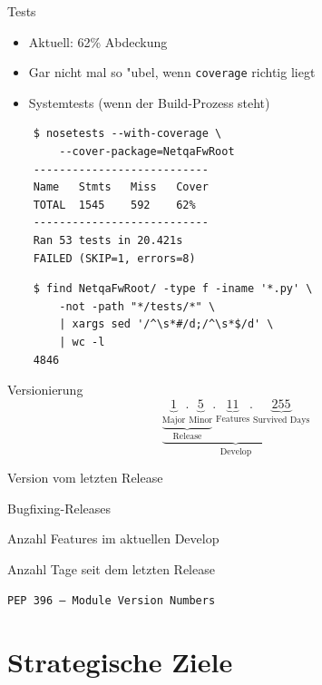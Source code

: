 \documentclass{beamer}
\begin{document}
\begin{frame}[fragile]{Tests}
	\begin{itemize}
		\item Aktuell: 62\% Abdeckung
		\item Gar nicht mal so "ubel, wenn \texttt{coverage} richtig liegt
		\item Systemtests (wenn der Build-Prozess steht)
	\end{itemize}
	
	\begin{overprint}
	\begin{verbatim}
	$ nosetests --with-coverage \
		--cover-package=NetqaFwRoot
	---------------------------
	Name   Stmts   Miss   Cover
	TOTAL  1545    592    62%
	---------------------------
	Ran 53 tests in 20.421s
	FAILED (SKIP=1, errors=8)
	\end{verbatim}
	
	\begin{verbatim}
	$ find NetqaFwRoot/ -type f -iname '*.py' \
		-not -path "*/tests/*" \
		| xargs sed '/^\s*#/d;/^\s*$/d' \
		| wc -l
	4846
	\end{verbatim}
	\end{overprint}
\end{frame}

\begin{frame}{Versionierung}
	\begin{equation*}
		\underbrace{\underbrace{\underbrace{1}_{\text{Major}}.\underbrace{5}_{\text{Minor}}}_{\text{Release}}.\underbrace{11}_{\text{Features}}.\underbrace{255}_{\text{Survived Days}}}_{\text{Develop}}
	\end{equation*}
	\vfill
	\begin{description}[Survived Days:]
		\item[Major:] Version vom letzten Release
		\item[Minor:] Bugfixing-Releases
		\item[Features:] Anzahl Features im aktuellen Develop
		\item[Survived Days:] Anzahl Tage seit dem letzten Release
		\item[Ansonsten:] \texttt{PEP\,396 -- Module Version Numbers}
	\end{description}
\end{frame}

\section{Strategische Ziele}
\end{document}
